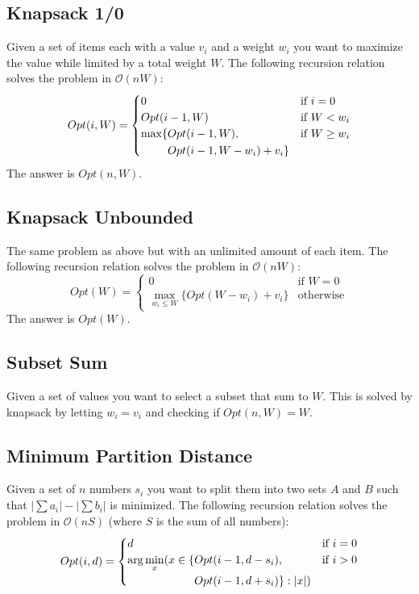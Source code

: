 \documentclass[8pt,a4paper,landscape,oneside]{amsart}
\newcommand{\bigO}{\mathcal{O}}
\begin{document}
\begin{multicols*}{3}
  \subsection{Knapsack 1/0}
  Given a set of items each with a value $v_i$ and a weight $w_i$ you want to maximize the value while limited by a total weight $W$. The following recursion relation solves the problem in $\bigO(nW)$:
  \[
  Opt(i,W) = \begin{cases}
  0 & \text{if } i=0 \\
  Opt(i-1,W) & \text{if } W<w_i \\
  \begin{aligned}[t]\arraycolsep=0pt
    \max\lbrace &
      Opt(i-1,W), \\ &
      Opt(i-1,W-w_i) + v_i \rbrace
  \end{aligned} & \text{if } W \geq w_i
  \end{cases}
  \]
  The answer is $Opt(n, W)$.
  
  \subsection{Knapsack Unbounded}
  The same problem as above but with an unlimited amount of each item. The following recursion relation solves the problem in $\bigO(nW)$:
  \[
  Opt(W) = \begin{cases}
  0 & \text{if } W=0 \\
  \max\limits_{w_i \leq W} \lbrace Opt(W-w_i) + v_i \rbrace & \text{otherwise}
  \end{cases}
  \]
  The answer is $Opt(W)$.
  
  \subsection{Subset Sum}
  \label{subset-sum}
  Given a set of values you want to select a subset that sum to $W$. This is solved by knapsack by letting $w_i = v_i$ and checking if $Opt(n, W) = W$.
  
  \subsection{Minimum Partition Distance}
  Given a set of $n$ numbers $s_i$ you want to split them into two sets $A$ and $B$ such that $|\sum a_i| - |\sum b_i|$ is minimized. The following recursion relation solves the problem in $\bigO(nS)$ (where $S$ is the sum of all numbers):
  \[
  Opt(i,d) = \begin{cases}
  d & \text{if } i=0 \\
  \begin{aligned}[t]\arraycolsep=0pt
    \arg\min\limits_x(x \in \{ & Opt(i-1,d-s_i), \\ &
    Opt(i-1,d+s_i)\} : |x|)
  \end{aligned} & \text{if } i > 0 \\
  

\end{cases}\]
\end{multicols*}
\end{document}
